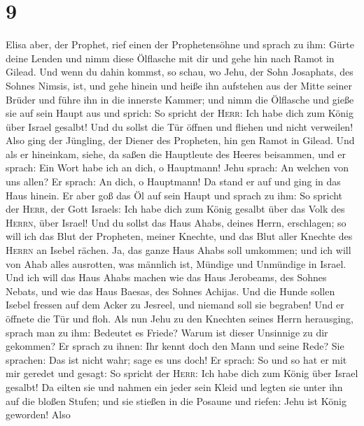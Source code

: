 \hypertarget{section-8}{%
\section{9}\label{section-8}}

 Elisa aber, der Prophet, rief einen der Prophetensöhne
und sprach zu ihm: Gürte deine Lenden und nimm diese Ölflasche mit dir
und gehe hin nach Ramot in Gilead.  Und wenn du dahin
kommst, so schau, wo Jehu, der Sohn Josaphats, des Sohnes Nimsis, ist,
und gehe hinein und heiße ihn aufstehen aus der Mitte seiner Brüder und
führe ihn in die innerste Kammer;  und nimm die Ölflasche
und gieße sie auf sein Haupt aus und sprich: So spricht der
\textsc{Herr}: Ich habe dich zum König über Israel gesalbt! Und du
sollst die Tür öffnen und fliehen und nicht verweilen! 
Also ging der Jüngling, der Diener des Propheten, hin gen Ramot in
Gilead.  Und als er hineinkam, siehe, da saßen die
Hauptleute des Heeres beisammen, und er sprach: Ein Wort habe ich an
dich, o Hauptmann! Jehu sprach: An welchen von uns allen? Er sprach: An
dich, o Hauptmann!  Da stand er auf und ging in das Haus
hinein. Er aber goß das Öl auf sein Haupt und sprach zu ihm: So spricht
der \textsc{Herr}, der Gott Israels: Ich habe dich zum König gesalbt
über das Volk des \textsc{Herrn}, über Israel!  Und du
sollst das Haus Ahabs, deines Herrn, erschlagen; so will ich das Blut
der Propheten, meiner Knechte, und das Blut aller Knechte des
\textsc{Herrn} an Isebel rächen.  Ja, das ganze Haus Ahabs
soll umkommen; und ich will von Ahab alles ausrotten, was männlich ist,
Mündige und Unmündige in Israel.  Und ich will das Haus
Ahabs machen wie das Haus Jerobeams, des Sohnes Nebats, und wie das Haus
Baesas, des Sohnes Achijas.  Und die Hunde sollen Isebel
fressen auf dem Acker zu Jesreel, und niemand soll sie begraben! Und er
öffnete die Tür und floh.  Als nun Jehu zu den Knechten
seines Herrn herausging, sprach man zu ihm: Bedeutet es Friede? Warum
ist dieser Unsinnige zu dir gekommen? Er sprach zu ihnen: Ihr kennt doch
den Mann und seine Rede?  Sie sprachen: Das ist nicht
wahr; sage es uns doch! Er sprach: So und so hat er mit mir geredet und
gesagt: So spricht der \textsc{Herr}: Ich habe dich zum König über
Israel gesalbt!  Da eilten sie und nahmen ein jeder sein
Kleid und legten sie unter ihn auf die bloßen Stufen; und sie stießen in
die Posaune und riefen: Jehu ist König geworden!  Also
